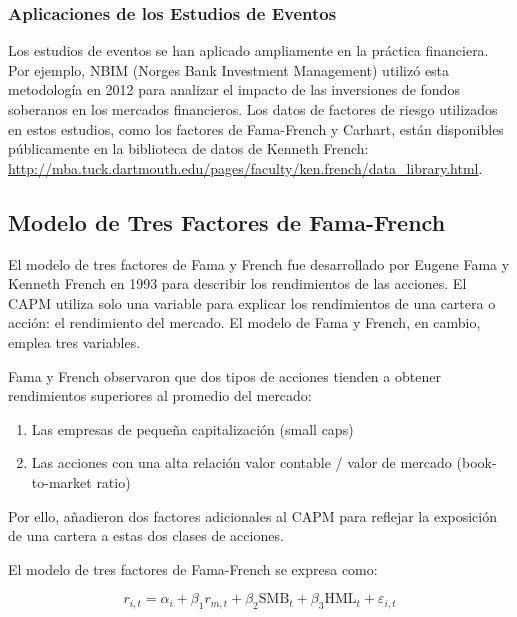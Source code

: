 \subsubsection{Aplicaciones de los Estudios de Eventos}

Los estudios de eventos se han aplicado ampliamente en la práctica financiera. Por ejemplo, NBIM (Norges Bank Investment Management) utilizó esta metodología en 2012 para analizar el impacto de las inversiones de fondos soberanos en los mercados financieros. Los datos de factores de riesgo utilizados en estos estudios, como los factores de Fama-French y Carhart, están disponibles públicamente en la biblioteca de datos de Kenneth French: \url{http://mba.tuck.dartmouth.edu/pages/faculty/ken.french/data_library.html}.

\subsection{Modelo de Tres Factores de Fama-French}

El modelo de tres factores de Fama y French fue desarrollado por Eugene Fama y Kenneth French en 1993 para describir los rendimientos de las acciones. El CAPM utiliza solo una variable para explicar los rendimientos de una cartera o acción: el rendimiento del mercado. El modelo de Fama y French, en cambio, emplea tres variables.

\begin{teorema}
Fama y French observaron que dos tipos de acciones tienden a obtener rendimientos superiores al promedio del mercado:
\begin{enumerate}
\item Las empresas de pequeña capitalización (small caps)
\item Las acciones con una alta relación valor contable / valor de mercado (book-to-market ratio)
\end{enumerate}

Por ello, añadieron dos factores adicionales al CAPM para reflejar la exposición de una cartera a estas dos clases de acciones.
\end{teorema}

El modelo de tres factores de Fama-French se expresa como:

\begin{equation}
r_{i,t} = \alpha_i + \beta_1 r_{m,t} + \beta_2 \text{SMB}_t + \beta_3 \text{HML}_t + \varepsilon_{i,t}
\end{equation}


